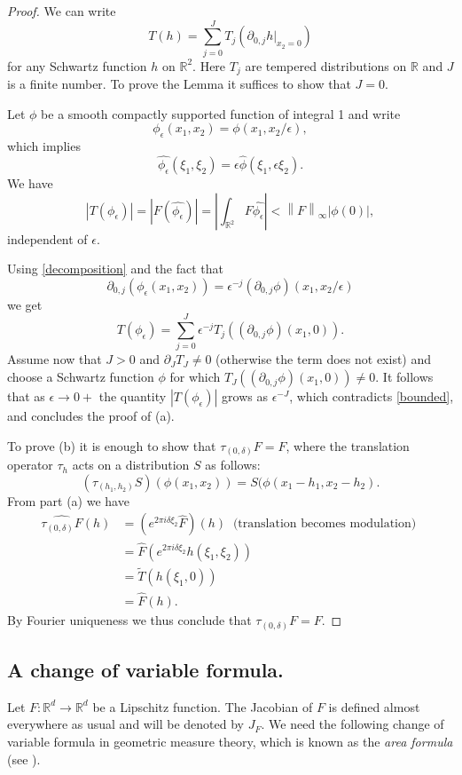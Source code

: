 \documentclass[12pt,a4paper,oneside]{amsart}
\theoremstyle{definition}
\newcommand{\Abs}[1]{{\left|{#1}\right|}}
\newcommand{\Linf}[1]{{\left\|{#1}\right\|_\infty}}
\newcommand{\RR}{{\mathbb R}}
\newcommand{\ft}[1]{\widehat{#1}}
\newcommand{\wt}[1]{\widetilde{#1}}
\begin{document}
\begin{proof}
We can write \cite[Problem 5.6.10]{knapp2017advanced} 
\begin{equation}\label{decomposition}
T(h) = \sum_{j=0}^J T_j(\partial_{0,j}h |_{x_2=0})
\end{equation}
for any Schwartz function $h$ on $\RR^2$. Here $T_j$ are tempered distributions on $\RR$ and $J$ is a finite number. To prove the Lemma it suffices to show that $J=0$.

Let $\phi$ be a smooth compactly supported function of integral 1 and write
$$
\phi_\epsilon(x_1, x_2) =  \phi(x_1, x_2/\epsilon),
$$
which implies
$$
\ft{\phi_\epsilon}(\xi_1, \xi_2) = \epsilon \ft{\phi}(\xi_1, \epsilon \xi_2).
$$
We have
\begin{equation}\label{bounded}
\Abs{T(\phi_\epsilon)} = \Abs{F(\ft{\phi_\epsilon})} = \Abs{ \int_{\RR^2} F \ft{\phi_\epsilon} } < \Linf{F} \Abs{\phi(0)},
\end{equation}
independent of $\epsilon$. 

Using \eqref{decomposition} and the fact that
$$
\partial_{0,j}\left(\phi_\epsilon(x_1, x_2)\right) =
 \epsilon^{-j} (\partial_{0,j}\phi) (x_1, x_2/\epsilon)
$$
we get
$$
T(\phi_\epsilon) = \sum_{j=0}^J \epsilon^{-j} T_j((\partial_{0,j} \phi)(x_1, 0)).
$$
Assume now that $J>0$ and $\partial_J T_J \neq 0$ (otherwise the term does not exist) and choose a Schwartz function $\phi$ for which $T_J((\partial_{0,j} \phi)(x_1, 0)) \neq 0$. It follows that as $\epsilon \to 0+$ the quantity $\Abs{T(\phi_\epsilon)}$ grows as $\epsilon^{-J}$, which contradicts \eqref{bounded}, and concludes the proof of (a).

To prove (b) it is enough to show that $\tau_{(0,\delta)}F = F$, where the translation operator $\tau_h$ acts on a distribution $S$ as follows:
$$
(\tau_{(h_1, h_2)} S)(\phi(x_1, x_2)) = S(\phi(x_1-h_1, x_2-h_2).
$$
From part (a) we have 
\begin{align*}
\ft{\tau_{(0, \delta)} F} (h) &= (e^{2\pi i \delta \xi_2} \ft{F} )(h) \ \text{ (translation becomes modulation) }\\
& = \ft{F} ( e^{2\pi i \delta \xi_2} h(\xi_1, \xi_2)) \\
& = \wt T(h(\xi_1, 0)) \\
&= \ft{F} (h).
\end{align*}
By Fourier uniqueness we thus conclude that $\tau_{(0, \delta)} F = F$.
\end{proof}


\subsection{A change of variable formula.}     Let $F: \RR^d\to\RR^d$ be a Lipschitz function. The Jacobian of $F$ is defined almost everywhere as usual and will be denoted by $J_F$.  We need the following change of variable formula in geometric measure theory, which is known as the {\it area formula} (see \cite[{\S 3.3.3}]{Evans-Gariepy}). 
\end{document}
